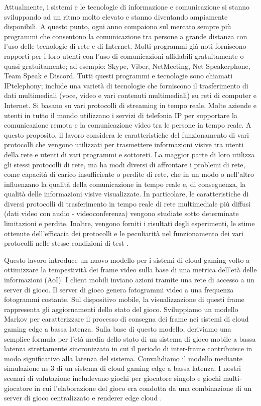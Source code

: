 Attualmente, i sistemi e le tecnologie di informazione e comunicazione si stanno sviluppando ad un ritmo molto elevato e stanno diventando ampiamente disponibili. A questo punto, ogni anno compaiono sul mercato sempre più programmi che consentono la comunicazione tra persone a grande distanza con l'uso delle tecnologie di rete e di Internet. Molti programmi già noti forniscono rapporti per i loro utenti con l'uso di comunicazioni affidabili gratuitamente o quasi gratuitamente; ad esempio: Skype, Viber, NetMeeting, Net Speakerphone, Team Speak e Discord. Tutti questi programmi e tecnologie sono chiamati IPtelephony; include una varietà di tecnologie che forniscono il trasferimento di dati multimediali (voce, video e vari contenuti multimediali) su reti di computer e Internet. Si basano su vari protocolli di streaming in tempo reale. Molte aziende e utenti in tutto il mondo utilizzano i servizi di telefonia IP per supportare la comunicazione remota e la comunicazione video tra le persone in tempo reale. A questo proposito, il lavoro considera le caratteristiche del funzionamento di vari protocolli che vengono utilizzati per trasmettere informazioni visive tra utenti della rete e utenti di vari programmi e sottoreti. La maggior parte di loro utilizza gli stessi protocolli di rete, ma ha modi diversi di affrontare i problemi di rete, come capacità di carico insufficiente o perdite di rete, che in un modo o nell'altro influenzano la qualità della comunicazione in tempo reale e, di conseguenza, la qualità delle informazioni visive visualizzate. In particolare, le caratteristiche di diversi protocolli di trasferimento in tempo reale di rete multimediale più diffusi (dati video con audio - videoconferenza) vengono studiate sotto determinate limitazioni e perdite. Inoltre, vengono forniti i risultati degli esperimenti, le stime ottenute dell'efficacia dei protocolli e le peculiarità nel funzionamento dei vari protocolli nelle stesse condizioni di test \parencite{Network_technology_for_transmission_of_visual_information}.

Questo lavoro introduce un nuovo modello per i sistemi di cloud gaming volto a ottimizzare la tempestività dei frame video sulla base di una metrica dell'età delle informazioni (AoI). I client mobili inviano azioni tramite una rete di accesso a un server di gioco. Il server di gioco genera fotogrammi video a una frequenza fotogrammi costante. Sul dispositivo mobile, la visualizzazione di questi frame rappresenta gli aggiornamenti dello stato del gioco. Sviluppiamo un modello Markov per caratterizzare il processo di consegna dei frame nei sistemi di cloud gaming edge a bassa latenza. Sulla base di questo modello, deriviamo una semplice formula per l'età media dello stato di un sistema di gioco mobile a bassa latenza strettamente sincronizzato in cui il periodo di inter-frame contribuisce in modo significativo alla latenza del sistema. Convalidiamo il modello mediante simulazione ns-3 di un sistema di cloud gaming edge a bassa latenza. I nostri scenari di valutazione includevano giochi per giocatore singolo e giochi multi-giocatore in cui l'elaborazione del gioco era condotta da una combinazione di un server di gioco centralizzato e renderer edge cloud \parencite{Timely_cloud_gaming}.

